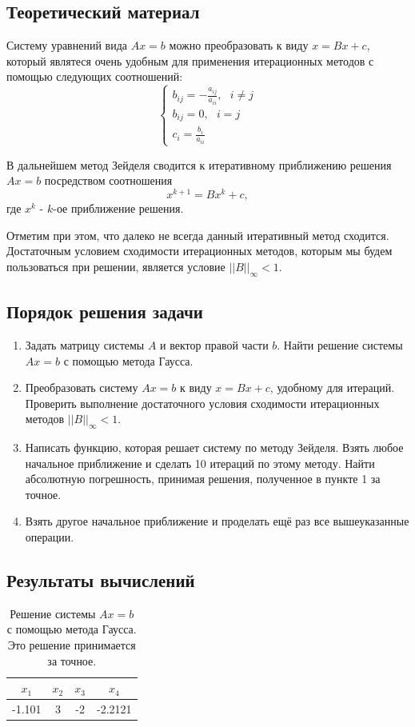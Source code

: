 \documentclass[12pt]{article}%
\begin{document}
\subsection{Теоретический материал}
Систему уравнений вида $Ax=b$ можно преобразовать к виду $x = Bx + c$, который являтеся очень удобным для применения итерационных методов с помощью следующих соотношений:
\begin{equation}
    \begin{cases}
        b_{ij} = -\frac{a_{ij}}{a_{ii}},\ \ \ i \ne j \\
        b_{ij} = 0,\ \ \ i = j \\
        c_{i} = \frac{b_i}{a_{ii}}
    \end{cases}
\end{equation}

В дальнейшем метод Зейделя сводится к итеративному приближению решения $Ax=b$ посредством соотношения
\begin{equation}
    x^{k+1} = Bx^k + c,
\end{equation}
где $x^k$ - $k$-ое приближение решения.

Отметим при этом, что далеко не всегда данный итеративный метод сходится. Достаточным условием сходимости итерационных методов, которым мы будем пользоваться при решении, является условие $||B||_{\infty} < 1$.

\subsection{Порядок решения задачи}
\begin{enumerate}
    \item Задать матрицу системы $A$ и вектор правой части $b$. Найти решение системы $Ax=b$ с помощью метода Гаусса.
    \item Преобразовать систему $Ax=b$ к виду $x = Bx+c$, удобному для итераций. Проверить выполнение достаточного условия сходимости итерационных методов $||B||_{\infty} < 1$.
    \item Написать функцию, которая решает систему по методу Зейделя. Взять любое начальное приближение и сделать 10 итераций по этому методу. Найти абсолютную погрешность, принимая решения, полученное в пункте 1 за точное.
    \item Взять другое начальное приближение и проделать ещё раз все вышеуказанные операции. 
\end{enumerate}

\subsection{Результаты вычислений}
\begin{table}[h]
    \centering
    \begin{tabular}{|c|c|c|c|}
         \hline $x_1$ & $x_2$ & $x_3$ & $x_4$   \\
         \hline -1.101 & 3 & -2 & -2.2121 \\
         \hline
    \end{tabular}
    \caption{Решение системы $Ax=b$ с помощью метода Гаусса. Это решение принимается за точное.}
\end{table}
\end{document}
